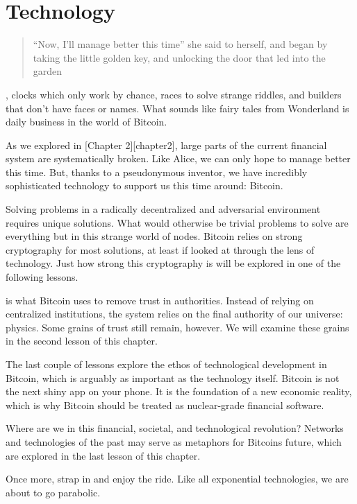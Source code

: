 \part{Technology}
\label{ch:technology}

\blockquote{
``Now, I'll manage better this time'' she said to herself, and began by taking
the little golden key, and unlocking the door that led into the garden
}

, clocks which only work by chance, races to solve
strange riddles, and builders that don't have faces or names. What sounds like
fairy tales from Wonderland is daily business in the world of Bitcoin.

As we explored in [Chapter 2][chapter2], large parts of the current financial
system are systematically broken. Like Alice, we can only hope to manage better
this time. But, thanks to a pseudonymous inventor, we have incredibly
sophisticated technology to support us this time around: Bitcoin.

Solving problems in a radically decentralized and adversarial environment
requires unique solutions. What would otherwise be trivial problems to solve
are everything but in this strange world of nodes. Bitcoin relies on strong
cryptography for most solutions, at least if looked at through the lens of
technology. Just how strong this cryptography is will be explored in one of the
following lessons.

 is what Bitcoin uses to remove trust in authorities.
Instead of relying on centralized institutions, the system relies on the final
authority of our universe: physics. Some grains of trust still remain, however.
We will examine these grains in the second lesson of this chapter.


The last couple of lessons explore the ethos of technological development in
Bitcoin, which is arguably as important as the technology itself. Bitcoin is not
the next shiny app on your phone. It is the foundation of a new economic
reality, which is why Bitcoin should be treated as nuclear-grade financial
software.

Where are we in this financial, societal, and technological revolution? Networks
and technologies of the past may serve as metaphors for Bitcoins future, which
are explored in the last lesson of this chapter.

Once more, strap in and enjoy the ride. Like all exponential technologies, we
are about to go parabolic.
